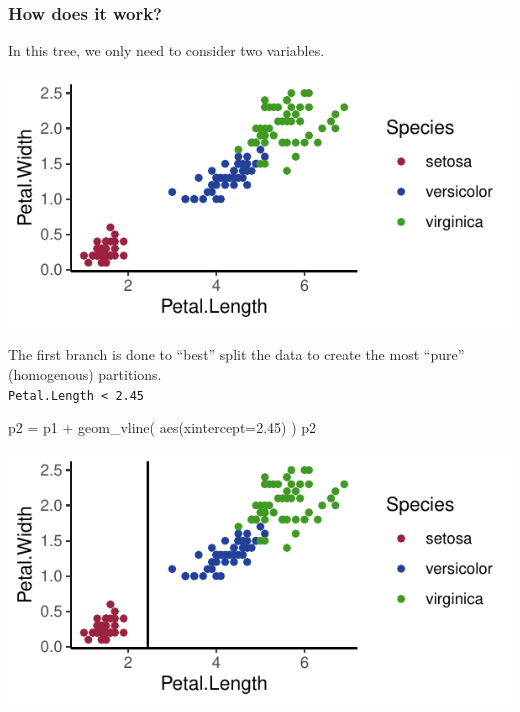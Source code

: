 \documentclass[a4paper]{article}
\begin{document}
\subsubsection{How does it work?}
In this tree, we only need to consider two variables.
\begin{Schunk}


{\centering \includegraphics[width=\maxwidth]{figure/listings-unnamed-chunk-429-1} 

}

\end{Schunk}
The first branch is done to ``best'' split the data to create the most ``pure'' (homogenous) partitions.\\
\lstinline|Petal.Length < 2.45|
\begin{Schunk}
\begin{Sinput}
p2 = p1 + 
  geom_vline(
    aes(xintercept=2.45)
  )
p2
\end{Sinput}


{\centering \includegraphics[width=\maxwidth]{figure/listings-unnamed-chunk-430-1} 

}

\end{Schunk}
\end{document}
